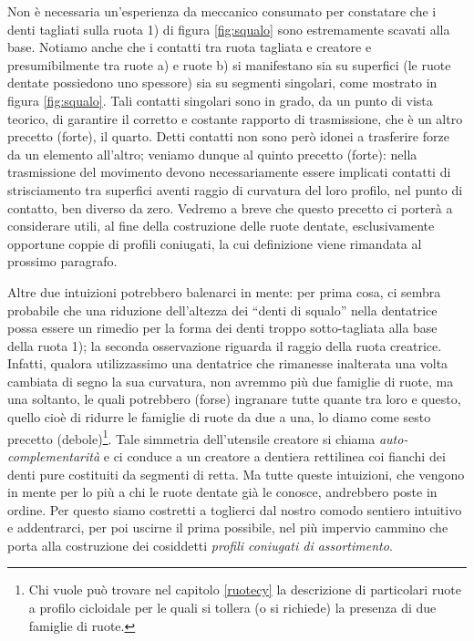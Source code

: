 \noindent  Non \`e necessaria un'esperienza da meccanico consumato
per constatare  che i denti tagliati sulla ruota 1) di figura \ref{fig:squalo}
sono estremamente scavati alla base.
Notiamo anche che i contatti tra ruota tagliata e creatore e presumibilmente 
tra ruote a) e ruote b) si manifestano sia su superfici (le ruote
dentate possiedono uno spessore) sia su segmenti singolari, come mostrato
in figura \ref{fig:squalo}.
Tali contatti singolari sono in grado, da un punto di vista teorico,
di garantire il corretto e costante rapporto di trasmissione, 
che \`e un altro precetto (forte), il quarto.
Detti contatti non sono per\`o idonei a trasferire forze da un elemento
all'altro;
veniamo dunque al quinto precetto (forte):
nella trasmissione del movimento devono necessariamente
essere implicati contatti di strisciamento tra superfici
aventi raggio di curvatura del loro profilo, nel punto di contatto,
 ben diverso da zero. Vedremo
a breve che questo precetto ci porter\`a a considerare utili,
al fine della costruzione delle ruote dentate, esclusivamente opportune
coppie di profili
coniugati, la cui definizione viene rimandata al prossimo paragrafo.

\noindent Altre due intuizioni potrebbero balenarci in mente:
per prima cosa, ci sembra probabile che una riduzione
dell'altezza dei ``denti di squalo'' nella dentatrice possa essere un rimedio
per la forma dei denti
troppo sotto-tagliata alla base della ruota 1); la seconda osservazione
riguarda il raggio della ruota creatrice.
Infatti, qualora utilizzassimo una dentatrice
che rimanesse inalterata
una volta cambiata di segno la
sua curvatura, non avremmo pi\`u due famiglie di
ruote, ma una soltanto, le quali potrebbero (forse) ingranare tutte
quante tra loro e questo, quello cio\`e di ridurre le famiglie di ruote da due
a una, lo diamo come sesto precetto (debole)\footnote{Chi vuole
pu\`o trovare nel capitolo \ref{ruotecy} 
la descrizione di particolari ruote a profilo
cicloidale per le quali si tollera (o si richiede)
la presenza di due famiglie di ruote.}.
Tale simmetria  dell'utensile creatore si chiama
{\em auto-complementarit\`a} e
ci conduce  a un creatore a
dentiera rettilinea coi fianchi dei denti pure costituiti da segmenti di retta.
Ma tutte queste intuizioni, che vengono in mente per lo pi\`u a chi le ruote
dentate gi\`a le conosce, 
andrebbero poste in ordine. Per questo siamo costretti
 a toglierci dal nostro comodo sentiero intuitivo
e addentrarci, per poi uscirne il prima possibile, nel pi\`u impervio cammino
che porta alla costruzione dei cosiddetti {\em profili coniugati di
assortimento}.


